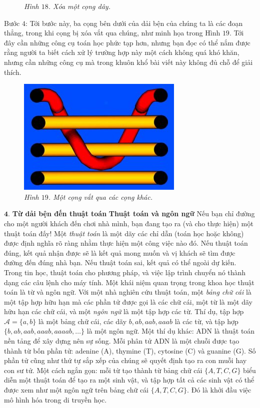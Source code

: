 \begin{multicols}{2}
\begin{figure}[H]
		\caption{\small\textit{\color{duongvaotoanhoc}Hình $18$. Xóa một cọng dây.}}
		\vspace*{-10pt}
	\end{figure}
	Bước $4$: Tới bước này, ba cọng bên dưới của dải bện của chúng ta là các đoạn thẳng, trong khi cọng bị xóa vắt qua chúng, như minh họa trong Hình $19$. Tới đây cần những công cụ toán học phức tạp hơn, nhưng bạn đọc có thể nắm được rằng người ta biết cách xử lý trường hợp này một cách không quá khó khăn, nhưng cần những công cụ mà trong khuôn khổ bài viết này không đủ chỗ để giải thích.
	\begin{figure}[H]
		\vspace*{-5pt}
		\centering
		\captionsetup{labelformat= empty, justification=centering}
		\includegraphics[width= 0.48\linewidth]{fig_19}
		\caption{\small\textit{\color{duongvaotoanhoc}Hình $19$. Một cọng vắt qua các cọng khác.}}
		\vspace*{-10pt}
	\end{figure}
	$\pmb{4.}$ \textbf{\color{duongvaotoanhoc}Từ dải bện đến thuật toán}
	\vskip 0.1cm
	\textbf{\color{duongvaotoanhoc}Thuật toán và ngôn ngữ}
	\vskip 0.1cm
	Nếu bạn chỉ đường cho một người khách đến chơi nhà mình, bạn đang tạo ra (và cho thực hiện) một thuật toán đấy! Một \textit{thuật toán} là một dãy các chỉ dẫn (toán học hoặc không) được định nghĩa rõ ràng nhằm thực hiện một công việc nào đó. Nếu thuật toán đúng, kết quả nhận được sẽ là kết quả mong muốn và vị khách sẽ tìm được đường đến đúng nhà bạn. Nếu thuật toán sai, kết quả có thể ngoài dự kiến. Trong tin học, thuật toán cho phương pháp, và việc lập trình chuyển nó thành dạng các câu lệnh cho máy tính.
	\vskip 0.1cm
	Một khái niệm quan trọng trong khoa học thuật toán là từ và ngôn ngữ. Với một nhà nghiên cứu thuật toán, một \textit{bảng chữ cái} là một tập hợp hữu hạn mà các phần tử được gọi là các chữ cái, một từ là một dãy hữu hạn các chữ cái, và một \textit{ngôn ngữ} là một tập hợp các từ. Thí dụ, tập hợp $\mathcal A = \{a, b\}$ là một bảng chữ cái, các dãy $b, ab, aab, aaab$ là các từ, và tập hợp $\{b, ab, aab, aaab, aaaab, \dots\}$ là một ngôn ngữ. Một thí dụ khác: ADN là thuật toán nền tảng để xây dựng nên sự sống. Mỗi phân tử ADN là một chuỗi được tạo thành từ bốn phần tử: adenine (A), thymine (T), cytosine (C) và guanine (G). Số phần tử cũng như thứ tự sắp xếp của chúng sẽ quyết định tạo ra con muỗi hay con sư tử. Một cách ngắn gọn: mỗi từ tạo thành từ bảng chữ cái $\{A, T, C, G\}$ biểu diễn một thuật toán để tạo ra một sinh vật, và tập hợp tất cả các sinh vật có thể được xem như một ngôn ngữ trên bảng chữ cái $\{A, T, C, G\}$. Đó là khởi đầu việc mô hình hóa trong di truyền học.

\end{multicols}
